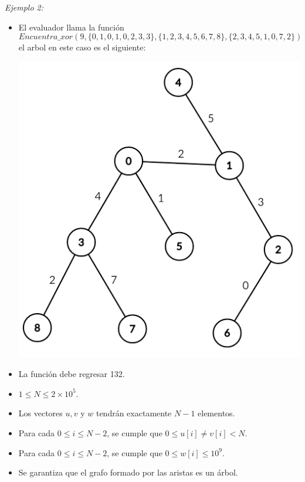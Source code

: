 \documentclass[12pt]{scrartcl}
\begin{document}
        {\itshape Ejemplo 2:}
        \begin{itemize}
            \item El evaluador llama la función $$Encuentra\_xor(9, \{0, 1, 0, 1, 0, 2, 3, 3\}, \{1, 2, 3, 4, 5, 6, 7, 8\}, \{2, 3, 4, 5, 1, 0, 7, 2\})$$ el arbol en este caso es el siguiente:

            \begin{center}
                \includegraphics[scale=0.5]{ej2.png}
            \end{center}
            \item La función debe regresar 132.
            
        \end{itemize}
               
        


    
        \begin{itemize}
            \item $1 \le N \le 2\times10^5$.
            \item Los vectores $u, v$ y $w$ tendrán exactamente $N - 1$ elementos.
            \item Para cada $0 \le i \le N - 2$, se cumple que $0 \le u[i] \neq v[i] < N$. 
            \item Para cada $0 \le i \le N - 2$, se cumple que $0 \le w[i] \le 10^9$.
            \item Se garantiza que el grafo formado por las aristas es un árbol.
        \end{itemize}
    
\end{document}
